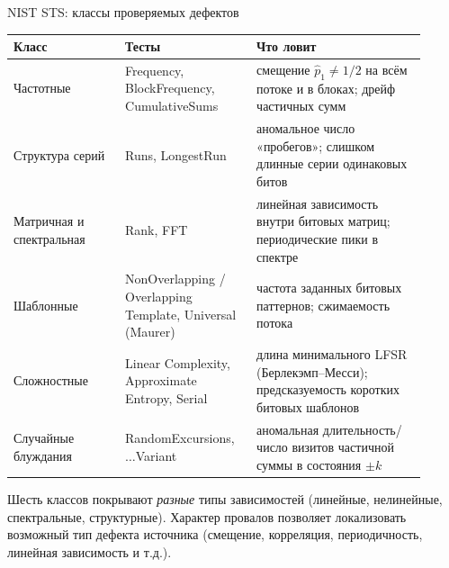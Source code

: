 \documentclass[14pt,aspectratio=169]{beamer}
\begin{document}
\begin{frame}{NIST STS: классы проверяемых дефектов}
  \scriptsize
  \setlength{\tabcolsep}{4pt}
  \renewcommand{\arraystretch}{1.2}
  \begin{tabular}{|p{0.25\linewidth}|p{0.28\linewidth}|p{0.38\linewidth}|}
    \hline
    \textbf{Класс} & \textbf{Тесты} & \textbf{Что ловит} \\ \hline
    Частотные &
      Frequency, BlockFrequency, CumulativeSums &
      смещение $\hat p_1 \ne 1/2$ на всём потоке и в блоках; дрейф частичных сумм \\ \hline
    Структура серий &
      Runs, LongestRun &
      аномальное число «пробегов»; слишком длинные серии одинаковых битов \\ \hline
    Матричная и спектральная &
      Rank, FFT &
      линейная зависимость внутри битовых матриц; периодические пики в спектре \\ \hline
    Шаблонные &
      NonOverlapping / Overlapping Template, Universal (Maurer) &
      частота заданных битовых паттернов; сжимаемость потока \\ \hline
    Сложностные &
      Linear Complexity, Approximate Entropy, Serial &
      длина минимального LFSR (Берлекэмп--Месси); предсказуемость коротких битовых шаблонов \\ \hline
    Случайные блуждания &
      RandomExcursions, $\ldots$Variant &
      аномальная длительность/число визитов частичной суммы в состояния $\pm k$ \\ \hline
  \end{tabular}
  \par\vspace{0.4em}
  Шесть классов покрывают \emph{разные} типы зависимостей (линейные, нелинейные, спектральные, структурные). Характер провалов позволяет локализовать возможный тип дефекта источника (смещение, корреляция, периодичность, линейная зависимость и т.д.).
\end{frame}
\end{document}
